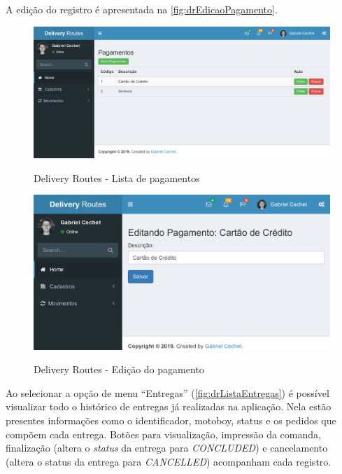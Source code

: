 A edição do registro é apresentada na \autoref{fig:drEdicaoPagamento}.

\begin{figure}[H]
    \centering
    \caption{Delivery Routes - Lista de pagamentos}
    \includegraphics[width=1.0\textwidth]{./dados/figuras/fig20}
    \label{fig:drListaPagamentos}
\end{figure}

\begin{figure}[H]
    \centering
    \caption{Delivery Routes - Edição do pagamento}
    \includegraphics[width=1.0\textwidth]{./dados/figuras/fig21}
    \label{fig:drEdicaoPagamento}
\end{figure}

\newpage
Ao selecionar a opção de menu “Entregas” (\autoref{fig:drListaEntregas}) é possível visualizar todo o histórico de entregas já realizadas na aplicação. Nela estão presentes informações como o identificador, motoboy, status e os pedidos que compõem cada entrega. Botões para visualização, impressão da comanda, finalização (altera o \textit{status} da entrega para \textit{CONCLUDED}) e cancelamento (altera o status da entrega para \textit{CANCELLED}) acompanham cada registro.

